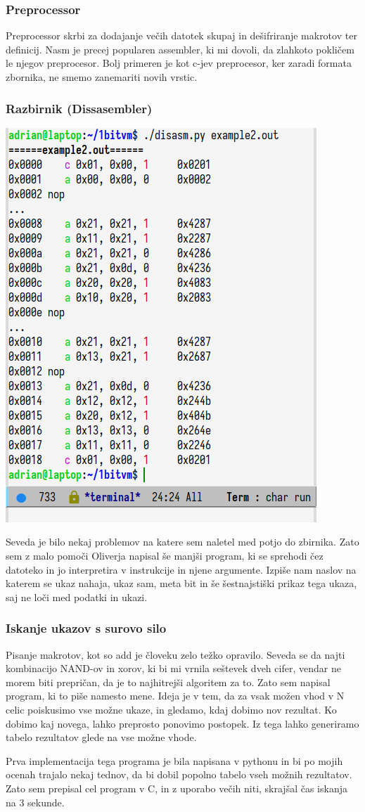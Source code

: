 \documentclass[12pt]{article}
\begin{document}
\subsubsection{Preprocessor}
Preprocessor skrbi za dodajanje večih datotek skupaj in dešifriranje makrotov ter definicij.
Nasm je precej popularen assembler, ki mi dovoli, da zlahkoto pokličem le njegov preprocesor.
Bolj primeren je kot c-jev preprocesor, ker zaradi formata zbornika, ne smemo zanemariti novih vrstic.
\subsubsection{Razbirnik (Dissasembler)}
\begin{center}
  \includegraphics[width=.3\linewidth]{slike/razbirnik.png}
\end{center}
Seveda je bilo nekaj problemov na katere sem naletel med potjo do zbirnika.
Zato sem z malo pomoči Oliverja napisal še manjši program, ki se sprehodi čez datoteko in jo interpretira v instrukcije in njene argumente.
Izpiše nam naslov na katerem se ukaz nahaja, ukaz sam, meta bit in še šestnajstiški prikaz tega ukaza, saj ne loči med podatki in ukazi.

\subsubsection{Iskanje ukazov s surovo silo}
Pisanje makrotov, kot so add je človeku zelo težko opravilo.
Seveda se da najti kombinacijo NAND-ov in xorov, ki bi mi vrnila seštevek dveh cifer, vendar ne morem biti prepričan, da je to najhitrejši algoritem za to.
Zato sem napisal program, ki to piše namesto mene.
Ideja je v tem, da za vsak možen vhod v N celic poiskusimo vse možne ukaze, in gledamo, kdaj dobimo nov rezultat.
Ko dobimo kaj novega, lahko preprosto ponovimo postopek.
Iz tega lahko generiramo tabelo rezultatov glede na vse možne vhode.

Prva implementacija tega programa je bila napisana v pythonu in bi po mojih ocenah trajalo nekaj tednov, da bi dobil popolno tabelo vseh možnih rezultatov.
Zato sem prepisal cel program v C, in z uporabo večih niti, skrajšal čas iskanja na 3 sekunde.
\end{document}
